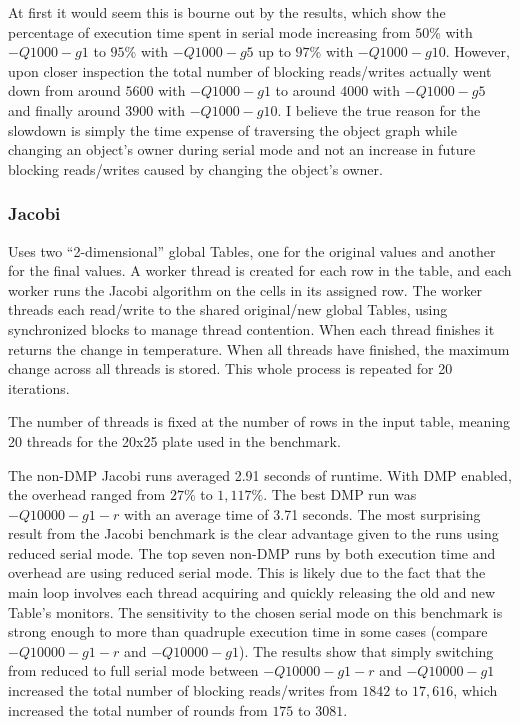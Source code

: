 At first it would seem this is bourne out by the results, which show
the percentage of execution time spent in serial mode increasing from
$50\%$ with $-Q1000 -g1$ to $95\%$ with $-Q1000 -g5$ up to $97\%$ with
$-Q1000 -g10$.  However, upon closer inspection the total number of
blocking reads/writes actually went down from around $5600$ with
$-Q1000 -g1$ to around $4000$ with $-Q1000 -g5$ and finally around
$3900$ with $-Q1000 -g10$.  I believe the true reason for the slowdown
is simply the time expense of traversing the object graph while
changing an object's owner during serial mode and not an increase in
future blocking reads/writes caused by changing the object's owner.

\subsubsection{Jacobi}

Uses two ``2-dimensional'' global Tables, one for the original values
and another for the final values.  A worker thread is created for each
row in the table, and each worker runs the Jacobi algorithm on the
cells in its assigned row.  The worker threads each read/write to the
shared original/new global Tables, using synchronized blocks to manage
thread contention.  When each thread finishes it returns the change in
temperature.  When all threads have finished, the maximum change
across all threads is stored.  This whole process is repeated for 20
iterations.

The number of threads is fixed at the number of rows in the input
table, meaning 20 threads for the 20x25 plate used in the benchmark.

The non-DMP Jacobi runs averaged 2.91 seconds of runtime.  With DMP
enabled, the overhead ranged from $27\%$ to $1,117\%$.  The best DMP
run was $-Q10000 -g1 -r$ with an average time of 3.71 seconds.  The
most surprising result from the Jacobi benchmark is the clear
advantage given to the runs using reduced serial mode.  The top seven
non-DMP runs by both execution time and overhead are using reduced
serial mode.  This is likely due to the fact that the main loop
involves each thread acquiring and quickly releasing the old and new
Table's monitors.  The sensitivity to the chosen serial mode on this
benchmark is strong enough to more than quadruple execution time in
some cases (compare $-Q10000 -g1 -r$ and $-Q10000 -g1$).  The results
show that simply switching from reduced to full serial mode between
$-Q10000 -g1 -r$ and $-Q10000 -g1$ increased the total number of
blocking reads/writes from $1842$ to $17,616$, which increased the
total number of rounds from $175$ to $3081$.

